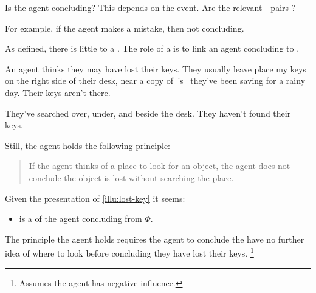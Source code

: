 \begin{note}
  Is the agent concluding?
  This depends on the event.
  Are the relevant - pairs ?

  For example, if the agent makes a mistake, then not concluding.
\end{note}

\begin{note}
  As defined, there is little to a .
  The role of a \requ{} is to link an agent concluding to .
\end{note}

\begin{note}
  \begin{scenario}%
    \label{illu:lost-key}%
    An agent thinks they may have lost their keys.
    They usually leave place my keys on the right side of their desk, near a copy of~\citeauthor{Vickers:1989tr}'s~ they've been saving for a rainy day.
    Their keys aren't there.

    They've searched over, under, and beside the desk.
    They haven't found their keys.

    Still, the agent holds the following principle:
    \begin{quote}
      If the agent thinks of a place to look for an object, the agent does not conclude the object is lost without searching the place.
    \end{quote}
  \end{scenario}

  \noindent%
  Given the presentation of \autoref{illu:lost-key} it seems:
  \begin{itemize}
  \item
     is a \requ{} of the agent concluding  from \(\Phi\).
  \end{itemize}
  The principle the agent holds requires the agent to conclude the have no further idea of where to look before concluding they have lost their keys.%
  \footnote{
    Assumes the agent has negative influence.

}
\end{note}

